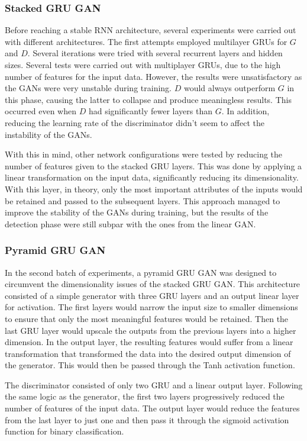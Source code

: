 \subsubsection*{Stacked GRU GAN}
Before reaching a stable RNN architecture, several experiments were carried out with different architectures. The first attempts employed multilayer GRUs for $G$ and $D$. Several iterations were tried with several recurrent layers and hidden sizes. Several tests were carried out with multiplayer GRUs, due to the high number of features for the input data. However, the results were unsatisfactory as the GANs were very unstable during training. $D$ would always outperform $G$ in this phase, causing the latter to collapse and produce meaningless results. This occurred even when $D$ had significantly fewer layers than $G$. In addition, reducing the learning rate of the discriminator didn't seem to affect the instability of the GANs. 

With this in mind, other network configurations were tested by reducing the number of features given to the stacked GRU layers. This was done by applying a linear transformation on the input data, significantly reducing its dimensionality. With this layer, in theory, only the most important attributes of the inputs would be retained and passed to the subsequent layers. This approach managed to improve the stability of the GANs during training, but the results of the detection phase were still subpar with the ones from the linear GAN.

\subsubsection*{Pyramid GRU GAN}
In the second batch of experiments, a pyramid GRU GAN was designed to circumvent the dimensionality issues of the stacked GRU GAN. This architecture consisted of a simple generator with three GRU layers and an output linear layer for activation.
The first layers would narrow the input size to smaller dimensions to ensure that only the most meaningful features would be retained. Then the last GRU layer would upscale the outputs from the previous layers into a higher dimension. In the output layer, the resulting features would suffer from a linear transformation that transformed the data into the desired output dimension of the generator. This would then be passed through the Tanh activation function.

The discriminator consisted of only two GRU and a linear output layer. Following the same logic as the generator, the first two layers progressively reduced the number of features of the input data. The output layer would reduce the features from the last layer to just one and then pass it through the sigmoid activation function for binary classification.

